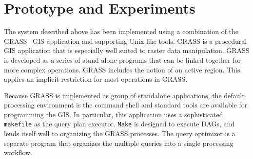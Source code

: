 \documentclass{ucdthesis}       %
\begin{document}
\section{Prototype and Experiments}
\label{sec:experiments-gis}

The system described above has been implemented using a combination of
the \ac{GRASS}~\cite{GRASS_GIS_software} \ac{GIS} application and
supporting Unix-like tools.  \ac{GRASS} is a procedural \ac{GIS}
application that is especially well suited to raster data
manipulation.  \ac{GRASS} is developed as a series of stand-alone
programs that can be linked together for more complex operations.
\ac{GRASS} includes the notion of an active region.  This applies an
implicit restriction for most operations in \ac{GRASS}.

Because \ac{GRASS} is implemented as group of standalone applications,
the default processing environment is the command shell and standard tools are
available for programming the \ac{GIS}.  In particular, this
application uses a sophisticated \texttt{makefile} as the query plan
executor.  \texttt{Make} is designed to execute \acp{DAG}, and lends
itself well to organizing the \ac{GRASS} processes.  The query
optimizer is a separate program that organizes the multiple queries
into a single processing workflow.
\end{document}
